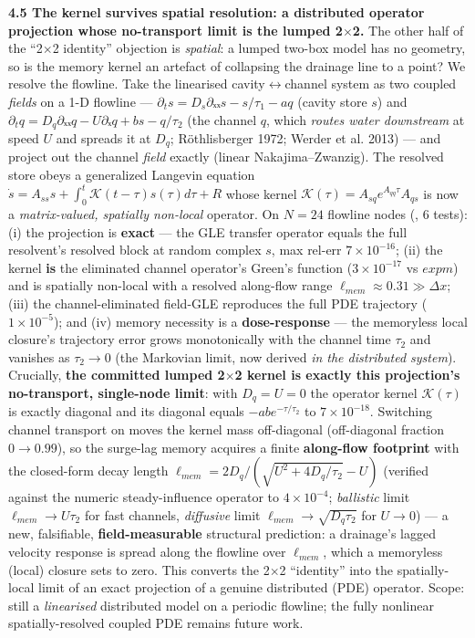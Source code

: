 \documentclass[11pt]{article}
\begin{document}
\textbf{4.5 The kernel survives spatial resolution: a distributed operator projection whose no-transport limit is the lumped 2\ensuremath{\times}2.} The other half of the ``2\ensuremath{\times}2 identity'' objection is \emph{spatial}: a lumped two-box model has no geometry, so is the memory kernel an artefact of collapsing the drainage line to a point? We resolve the flowline. Take the linearised cavity\ensuremath{\leftrightarrow}channel system as two coupled \emph{fields} on a 1-D flowline — $\partial _{t}s = D_{s} \partial ₓₓs - s/\tau _{1} - a q$ (cavity store $s$) and $\partial _{t}q = D_{q} \partial ₓₓq - U \partial ₓq + b s - q/\tau _{2}$ (the channel $q$, which \emph{routes water downstream} at speed $U$ and spreads it at $D_{q}$; Röthlisberger 1972; Werder et al. 2013) — and project out the channel \emph{field} exactly (linear Nakajima–Zwanzig). The resolved store obeys a generalized Langevin equation $\dot{s} = A_{ss} s + \int _{0}^{t} 𝒦(t-\tau ) s(\tau ) d\tau  + R$ whose kernel $𝒦(\tau ) = A_{sq} e^{A_{qq} \tau } A_{qs}$ is now a \emph{matrix-valued, spatially non-local} operator. On $N=24$ flowline nodes (, 6 tests): (i) the projection is \textbf{exact} — the GLE transfer operator equals the full resolvent's resolved block at random complex $s$, max rel-err $7\times 10^{-16}$; (ii) the kernel \textbf{is} the eliminated channel operator's Green's function ($3\times 10^{-17}$ vs $expm$) and is spatially non-local with a resolved along-flow range $\ell _{mem}\approx 0.31 \gg  \Delta x$; (iii) the channel-eliminated field-GLE reproduces the full PDE trajectory ($1\times 10^{-5}$); and (iv) memory necessity is a \textbf{dose-response} — the memoryless local closure's trajectory error grows monotonically with the channel time $\tau _{2}$ and vanishes as $\tau _{2}\to 0$ (the Markovian limit, now derived \emph{in the distributed system}). Crucially, \textbf{the committed lumped 2\ensuremath{\times}2 kernel is exactly this projection's no-transport, single-node limit}: with $D_{q}=U=0$ the operator kernel $𝒦(\tau )$ is exactly diagonal and its diagonal equals $-ab e^{-\tau /\tau _{2}}$ to $7\times 10^{-18}$. Switching channel transport on moves the kernel mass off-diagonal (off-diagonal fraction $0\to 0.99$), so the surge-lag memory acquires a finite \textbf{along-flow footprint} with the closed-form decay length $\ell _{mem} = 2D_{q}/(\sqrt{U^{2}+4D_{q}/\tau _{2}}-U)$ (verified against the numeric steady-influence operator to $4\times 10^{-4}$; \emph{ballistic} limit $\ell _{mem}\to U\tau _{2}$ for fast channels, \emph{diffusive} limit $\ell _{mem}\to \sqrt{D_{q}\tau _{2}}$ for $U\to 0$) — a new, falsifiable, \textbf{field-measurable} structural prediction: a drainage's lagged velocity response is spread along the flowline over $\ell _{mem}$, which a memoryless (local) closure sets to zero. This converts the 2\ensuremath{\times}2 ``identity'' into the spatially-local limit of an exact projection of a genuine distributed (PDE) operator. Scope: still a \emph{linearised} distributed model on a periodic flowline; the fully nonlinear spatially-resolved coupled PDE remains future work.
\end{document}
